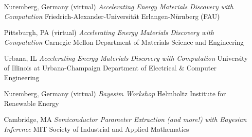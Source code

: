 \vspace{-2mm}
\datedsubsection{}
    {Nuremberg, Germany (virtual)}
    {\textit{Accelerating Energy Materials Discovery with Computation}}
    {Friedrich-Alexander-Universit\"at Erlangen-N\"urnberg (FAU)}

\vspace{-2mm}
\datedsubsection{}
    {Pittsburgh, PA (virtual)}
    {\textit{Accelerating Energy Materials Discovery with Computation}}
    {Carnegie Mellon Department of Materials Science and Engineering}

\vspace{-2mm}
\datedsubsection{}
    {Urbana, IL}
    {\textit{Accelerating Energy Materials Discovery with Computation}}
    {University of Illinois at Urbana-Champaign Department of Electrical \& Computer Engineering}

\vspace{-2mm}
    {Nuremberg, Germany (virtual)}
    {\textit{Bayesim Workshop}}
    {Helmholtz Institute for Renewable Energy}

\vspace{-2mm}
    {Cambridge, MA}
    {\textit{Semiconductor Parameter Extraction (and more!) with Bayesian Inference}}
    {MIT Society of Industrial and Applied Mathematics}
